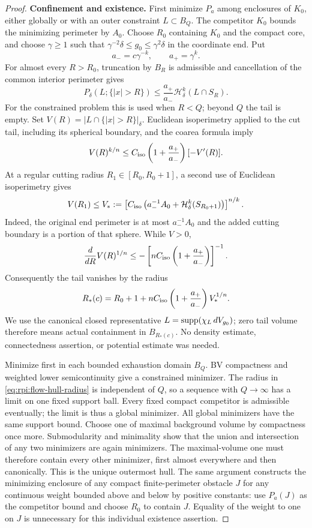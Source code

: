 \begin{proof}
\textbf{Confinement and existence.}\quad
First minimize $P_a$ among enclosures of $K_0$, either globally or
with an outer constraint $L\subset B_Q$. The competitor $K_0$ bounds
the minimizing perimeter by $A_0$.
Choose $R_0$ containing $K_0$ and the compact core, and choose
$\gamma\ge1$ such that
$\gamma^{-2}\delta\le g_0\le\gamma^2\delta$ in the coordinate
end. Put
\[
 a_-=c\gamma^{-k},\qquad a_+=\gamma^k.
\]
For almost every $R>R_0$, truncation by $B_R$ is admissible and
cancellation of the common interior perimeter gives
\begin{equation}
\label{eq:rpi:flow-truncation}
 P_\delta(L;\{|x|>R\})
 \le\frac{a_+}{a_-}\mathcal H^k_\delta(L\cap S_R).
\end{equation}
For the constrained problem this is used when $R<Q$; beyond $Q$
the tail is empty. Set $V(R)=|L\cap\{|x|>R\}|_\delta$.
Euclidean isoperimetry applied to the cut tail, including its
spherical boundary, and the coarea formula imply
\[
 V(R)^{k/n}
 \le C_{\rm iso}\left(1+\frac{a_+}{a_-}\right)[-V'(R)].
\]
At a regular cutting radius $R_1\in[R_0,R_0+1]$, a second use of
Euclidean isoperimetry gives
\[
 V(R_1)\le V_*:=
 \left[C_{\rm iso}\left(a_-^{-1}A_0+
              \mathcal H^k_\delta(S_{R_0+1})\right)\right]^{n/k}.
\]
Indeed, the original end perimeter is at most $a_-^{-1}A_0$ and
the added cutting boundary is a portion of that sphere. While
$V>0$,
\[
 \frac{d}{dR}V(R)^{1/n}
 \le-\left[nC_{\rm iso}\left(1+\frac{a_+}{a_-}\right)\right]^{-1}.
\]
Consequently the tail vanishes by the radius
\begin{equation}
\label{eq:rpi:flow-hull-radius}
 R_*(c)=R_0+1+
 nC_{\rm iso}\left(1+\frac{a_+}{a_-}\right)V_*^{1/n}.
\end{equation}
We use the canonical closed representative
$L=\operatorname{supp}(\chi_L\,dV_{g_0})$; zero tail volume therefore means
actual containment in $B_{R_*(c)}$. No density estimate,
connectedness assertion, or potential estimate was needed.

Minimize first in each bounded exhaustion domain $B_Q$. BV
compactness and weighted lower semicontinuity give a constrained
minimizer. The radius in \eqref{eq:rpi:flow-hull-radius} is
independent of $Q$, so a sequence with $Q\to\infty$ has a limit
on one fixed support ball. Every fixed compact competitor is
admissible eventually; the limit is thus a global minimizer.
All global minimizers have the same support bound. Choose one
of maximal background volume by compactness once more.
Submodularity and minimality show that the union and intersection
of any two minimizers are again minimizers. The maximal-volume
one must therefore contain every other minimizer, first almost
everywhere and then canonically. This is the unique outermost hull.
The same argument constructs the minimizing enclosure of any
compact finite-perimeter obstacle $J$ for any continuous weight
bounded above and below by positive constants: use $P_a(J)$ as
the competitor bound and choose $R_0$ to contain $J$.
Equality of the weight to one on $J$ is unnecessary for this
individual existence assertion.


\end{proof}
